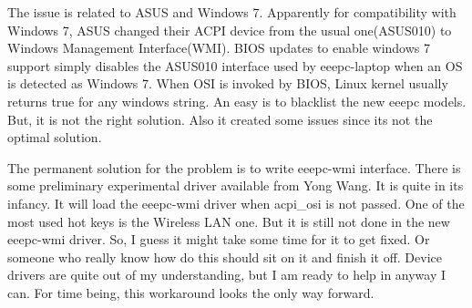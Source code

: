 The issue is related to ASUS and Windows 7. Apparently for compatibility with Windows 7, 
ASUS changed their ACPI device from the usual one(ASUS010) to Windows Management Interface(WMI). 
BIOS updates to enable windows 7 support simply disables the ASUS010 interface used by eeepc-laptop 
when an OS is detected as Windows 7. When OSI is invoked by BIOS, Linux kernel usually returns true 
for any windows string. An easy is to blacklist the new eeepc models. But, it is not the right solution. 
Also it created some issues since its not the optimal solution.

The permanent solution for the problem is to write eeepc-wmi interface. There is some preliminary 
experimental driver available from Yong Wang. It is quite in its infancy. It will load the eeepc-wmi 
driver when acpi\_osi is not passed. One of the most used hot keys is the Wireless LAN one. 
But it is still not done in the new eeepc-wmi driver. So, I guess it might take some time 
for it to get fixed. Or someone who really know how do this should sit on it and finish it off. 
Device drivers are quite out of my understanding, but I am ready to help in anyway I can. 
For time being, this workaround looks the only way forward.



\newpage 
